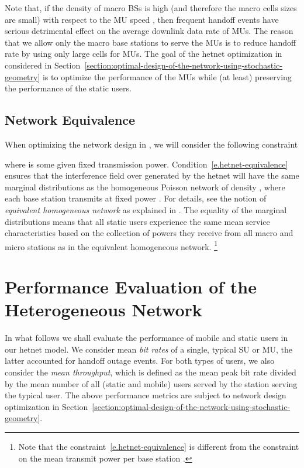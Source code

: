 \documentclass[10pt,journal]{IEEEtran}
\begin{document}
Note that, if the density of macro BSs is high  (and therefore the macro cells sizes are small) with respect to the 
MU speed , then frequent handoff events have serious detrimental effect on the average downlink  data rate of MUs. 
The reason that  we allow only the macro base stations to serve the MUs is to reduce handoff rate by using only large cells for MUs. 
The goal of the hetnet optimization in  considered 
in Section~\ref{section:optimal-design-of-the-network-using-stochastic-geometry} is to optimize the performance of the MUs 
while (at least) preserving the performance of the static users.

 

 

\subsection{Network Equivalence}
\label{ss.net-equivalence}
When optimizing the network design in , we will consider the following 
constraint 

where  is some given fixed transmission power.
Condition~\eqref{e.hetnet-equivalence} ensures that the interference field over  generated by the hetnet
will have the same marginal distributions as the homogeneous Poisson
network of density , where each base station transmits
at fixed power .  For details, see the notion of {\em equivalent homogeneous network} as 
explained in \cite{netequivalence,bartek-keeler15sinr-process-poisson-networks-factorial-moment-measures}. 
The equality of the marginal distributions means that all static users experience the same mean service characteristics
based on the collection of powers they receive from all macro and micro stations as 
in the equivalent homogeneous network.
\footnote{ Note that the constraint~\eqref{e.hetnet-equivalence} is  different from the 
constraint on the mean transmit power per base station .}


\section{Performance Evaluation of the Heterogeneous Network}
\label{ss.metrics}
In what follows we shall evaluate the performance of mobile and static
users in our hetnet model. We consider mean  {\em bit rates} of
a single, typical SU or MU, the latter accounted for handoff outage events.
For both types of users, we also consider the {\em mean throughput}, which is defined as
the mean peak bit rate divided by the mean number of all (static and mobile)
users served by the station serving the typical user.
The above performance metrics are subject to network design
optimization in Section~\ref{section:optimal-design-of-the-network-using-stochastic-geometry}.
\end{document}
